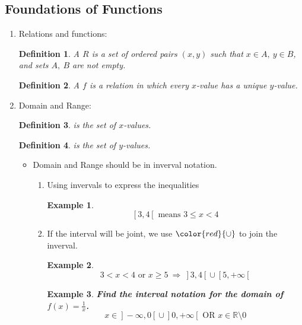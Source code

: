 \documentclass[12pt, a4paper]{article}
\newtheorem{definition}{Definition}[subsection]
\newtheorem{example}{Example}[subsection]
\def\R{{\mathbb{R}}}
\begin{document}
\subsection{Foundations of Functions}
\begin{enumerate}
    \item Relations and functions: 
    \begin{definition}
        A \textbf{\color{red}{relation}} $R$ is a set of ordered pairs $(x,y)$ such that $x\in A,\ y\in B$, and sets $A,\ B$ are not empty. 
    \end{definition}
    \begin{definition}
        A \textbf{\color{red}{function}} $f$ is a relation in which every $x$-value has a unique $y$-value. 
    \end{definition}
    \item Domain and Range: 
    \begin{definition}
        \textbf{\color{red}{Domain}} is the set of $x$-values. 
    \end{definition}
    \begin{definition}
        \textbf{\color{red}{Range}} is the set of $y$-values. 
    \end{definition}
    \begin{itemize}
        \item Domain and Range should be in inverval notation. 
        \begin{enumerate}
            \item Using invervals to express the inequalities
            \begin{example}
                $$\left[\right.3,4\left[\right. \text{ means }3\leq x<4$$
            \end{example}
            \item If the interval will be joint, we use ${\color{red}{\cup}}$ to join the inverval. 
            \begin{example}
                $$3<x<4\text{ or }x\geq 5\ \Rightarrow\ \left.\right]3,4\left[\right.\cup\left[5,+\infty\right.\left[\right.$$
            \end{example}
            \begin{example}
                \textbf{Find the interval notation for the domain of $\displaystyle f(x)=\frac{1}{x}$.}
                $$x\in\left.\right]-\infty,0\left[\right.\cup\left.\right]0,+\infty\left[\right.\text{ OR } x\in\R\setminus 0$$
                {\color{green}{Note: $\setminus$ means "exclude."}}
            \end{example}

\end{enumerate}
\end{itemize}
\end{enumerate}
\end{document}

